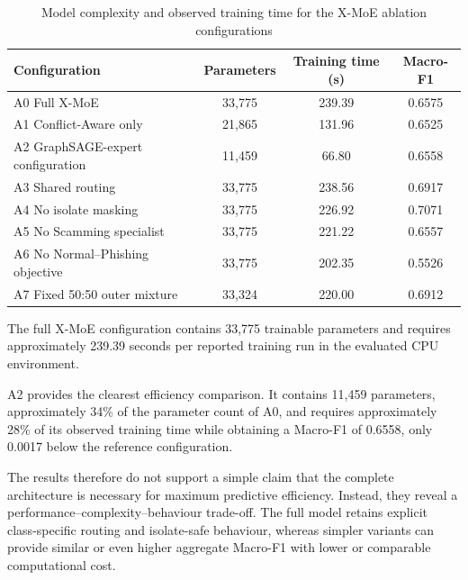 \documentclass{ieeeaccess}
\begin{document}
\begin{table}[t]
\centering
\caption{Model complexity and observed training time for the X-MoE ablation configurations}
\label{tab:efficiency_results}

\renewcommand{\arraystretch}{1.12}
\setlength{\tabcolsep}{5pt}
\scriptsize

\begin{tabular}{lccc}
\toprule
\textbf{Configuration} &
\textbf{Parameters} &
\textbf{Training time (s)} &
\textbf{Macro-F1} \\
\midrule

A0 Full X-MoE &
33,775 &
239.39 &
0.6575 \\

A1 Conflict-Aware only &
21,865 &
131.96 &
0.6525 \\

A2 GraphSAGE-expert configuration &
11,459 &
66.80 &
0.6558 \\

A3 Shared routing &
33,775 &
238.56 &
0.6917 \\

A4 No isolate masking &
33,775 &
226.92 &
0.7071 \\

A5 No Scamming specialist &
33,775 &
221.22 &
0.6557 \\

A6 No Normal--Phishing objective &
33,775 &
202.35 &
0.5526 \\

A7 Fixed 50:50 outer mixture &
33,324 &
220.00 &
0.6912 \\

\bottomrule
\end{tabular}
\end{table}

The full X-MoE configuration contains 33,775 trainable parameters and requires approximately 239.39 seconds per reported training run in the evaluated CPU environment.

A2 provides the clearest efficiency comparison. It contains 11,459 parameters, approximately 34\% of the parameter count of A0, and requires approximately 28\% of its observed training time while obtaining a Macro-F1 of 0.6558, only 0.0017 below the reference configuration.

The results therefore do not support a simple claim that the complete architecture is necessary for maximum predictive efficiency. Instead, they reveal a performance--complexity--behaviour trade-off. The full model retains explicit class-specific routing and isolate-safe behaviour, whereas simpler variants can provide similar or even higher aggregate Macro-F1 with lower or comparable computational cost.
\end{document}
